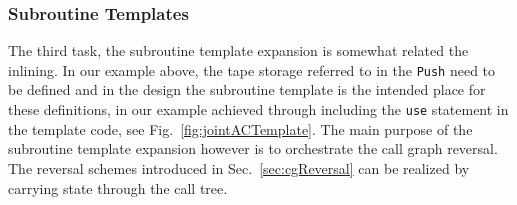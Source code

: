 \documentclass{book}
\newcommand{\code}[1]{{\small\tt{#1}}}
\newcommand{\refsec}[1]{{Sec.~\ref{#1}}}
\newcommand{\reffig}[1]{{Fig.~\ref{#1}}}
\begin{document}
\subsubsection{Subroutine Templates}\label{sssec:templates}
The third task, the subroutine template expansion is somewhat related the inlining. 
In our example above, the tape storage referred to in the \code{Push} need to be 
defined and in the design the subroutine template is the intended place for these definitions, 
in our example achieved through including the \code{use} statement in the template code, 
see \reffig{fig:jointACTemplate}.
The main purpose of the subroutine template expansion however is to orchestrate the 
call graph reversal. The reversal schemes introduced in \refsec{sec:cgReversal}
can be realized by carrying state through the call tree. 
\end{document}
